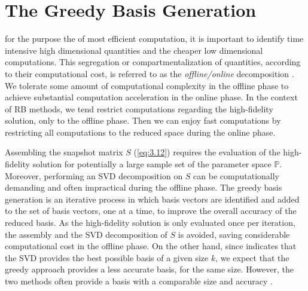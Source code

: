 \section{The Greedy Basis Generation} \label{sec:3.3}
for the purpose the of most efficient computation, it is important to identify time intensive high dimensional quantities and the cheaper low dimensional computations. This segregation or compartmentalization of quantities, according to their computational cost, is referred to as the \emph{offline/online} decomposition \cite{quarteroni2015reduced}. We tolerate some amount of computational complexity in the offline phase to achieve substantial computation acceleration in the online phase. In the context of RB methods, we tend restrict computations regarding the high-fidelity solution, only to the offline phase. Then we can enjoy fast computations by restricting all computations to the reduced space during the online phase.

Assembling the snapshot matrix $S$ (\ref{eq:3.12}) requires the evaluation of the high-fidelity solution for potentially a large sample set of the parameter space $\mathbb P$. Moreover, performing an SVD decomposition on $S$ can be computationally demanding and often impractical during the offline phase. The greedy basis generation is an iterative process in which basis vectors are identified and added to the set of basis vectors, one at a time, to improve the overall accuracy of the reduced basis. As the high-fidelity solution is only evaluated once per iteration, the assembly and the SVD decomposition of $S$ is avoided, saving considerable computational cost in the offline phase. On the other hand, since  indicates that the SVD provides the best possible basis of a given size $k$, we expect that the greedy approach provides a less accurate basis, for the same size. However, the two methods often provide a basis with a comparable size and accuracy \cite{quarteroni2015reduced}.

